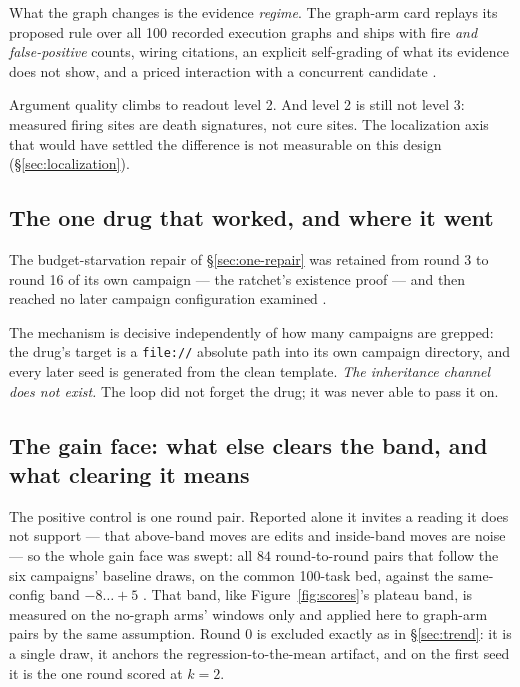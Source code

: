 What the graph changes is the evidence \emph{regime}. The graph-arm card
replays its proposed rule over all 100 recorded execution graphs and ships
with fire \emph{and false-positive} counts, wiring citations, an explicit
self-grading of what its evidence does not show, and a priced interaction
with a concurrent candidate .

Argument quality climbs to readout level 2. And level 2 is still not level
3: measured firing sites are death signatures, not cure sites. The
localization axis that would have settled the difference is not measurable
on this design (\S\ref{sec:localization}).

\subsection*{The one drug that worked, and where it went}

The budget-starvation repair of \S\ref{sec:one-repair} was retained from
round 3 to round 16 of its own campaign --- the ratchet's existence proof
--- and then reached no later campaign configuration examined .

The mechanism is decisive independently of how many campaigns are grepped:
the drug's target is a \texttt{file://} absolute path into its own campaign
directory, and every later seed is generated from the clean template.
\emph{The inheritance channel does not exist.} The loop did not forget the
drug; it was never able to pass it on.

\subsection*{The gain face: what else clears the band, and what clearing it
             means}
\label{sec:gain-face}

The positive control is one round pair. Reported alone it invites a reading
it does not support --- that above-band moves are edits and inside-band
moves are noise --- so the whole gain face was swept: all $84$
round-to-round pairs that follow the six campaigns' baseline draws, on the
common 100-task bed, against the same-config band $-8\ldots{+}5$ .
That band, like Figure~\ref{fig:scores}'s plateau band, is measured on
the no-graph arms' windows only  and applied here to
graph-arm pairs by the same assumption.
Round 0 is excluded exactly as in \S\ref{sec:trend}: it is a single draw,
it anchors the regression-to-the-mean artifact, and on the first seed it is
the one round scored at $k{=}2$.

